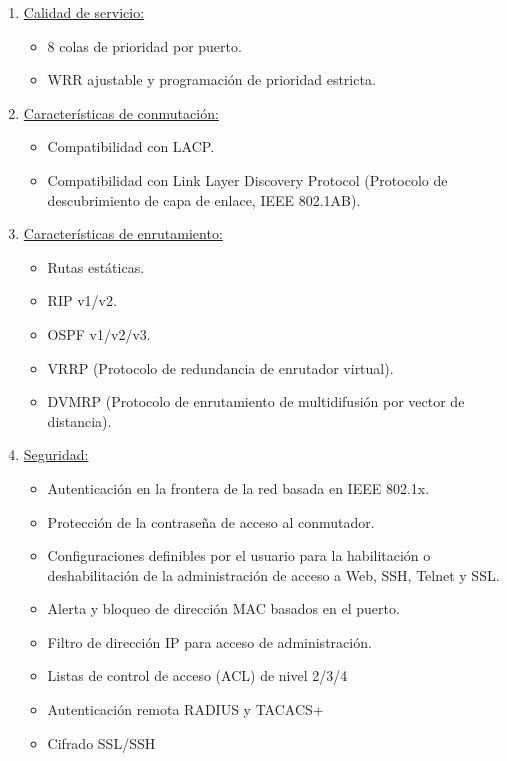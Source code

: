 \begin{enumerate}
\item \underline{Calidad de servicio:}
\begin{itemize}
  \item 8 colas de prioridad por puerto.
  \item WRR ajustable y programación de prioridad estricta.
\end{itemize}

\item \underline{Características de conmutación:}
\begin{itemize}
  \item Compatibilidad con LACP.
  \item Compatibilidad con Link Layer Discovery Protocol (Protocolo de descubrimiento de capa de enlace, IEEE 802.1AB).
\end{itemize}

\item \underline{Características de enrutamiento:}
\begin{itemize}
  \item Rutas estáticas.
  \item RIP v1/v2.
  \item OSPF v1/v2/v3.
  \item VRRP (Protocolo de redundancia de enrutador virtual).
  \item DVMRP (Protocolo de enrutamiento de multidifusión por vector de distancia).
\end{itemize}

\item \underline{Seguridad:}
\begin{itemize}
  \item Autenticación en la frontera de la red basada en IEEE 802.1x.
  \item Protección de la contraseña de acceso al conmutador.
  \item Configuraciones definibles por el usuario para la habilitación o deshabilitación de la administración de acceso a Web, SSH, Telnet y SSL.
  \item Alerta y bloqueo de dirección MAC basados en el puerto.
  \item Filtro de dirección IP para acceso de administración.
  \item Listas de control de acceso (ACL) de nivel 2/3/4
  \item Autenticación remota RADIUS y TACACS+
  \item Cifrado SSL/SSH
\end{itemize}


\end{enumerate}
